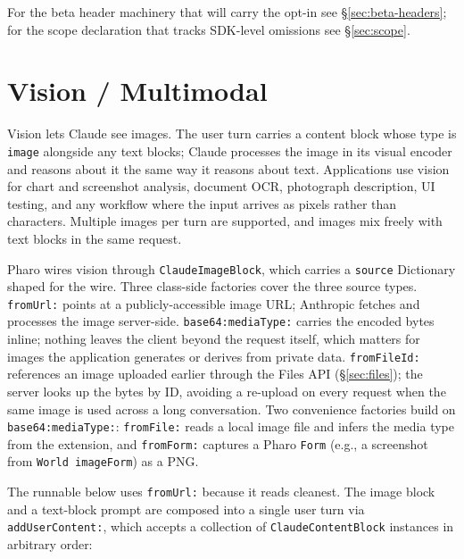 \documentclass[a4paper,10pt,fleqn]{article}
\begin{document}
For the beta header machinery that will carry the opt-in see
\S\ref{sec:beta-headers}; for the scope declaration that tracks
SDK-level omissions see \S\ref{sec:scope}.

\medskip
\begin{sloppypar}
\end{sloppypar}

\section{Vision / Multimodal}
\label{sec:vision}

Vision lets Claude see images.  The user turn carries a content
block whose type is \texttt{image} alongside any text blocks;
Claude processes the image in its visual encoder and reasons about
it the same way it reasons about text.  Applications use vision for
chart and screenshot analysis, document OCR, photograph
description, UI testing, and any workflow where the input arrives
as pixels rather than characters.  Multiple images per turn are
supported, and images mix freely with text blocks in the same
request.

Pharo wires vision through \texttt{ClaudeImageBlock}, which carries
a \texttt{source} Dictionary shaped for the wire.  Three class-side
factories cover the three source types.  \texttt{fromUrl:} points
at a publicly-accessible image URL; Anthropic fetches and processes
the image server-side.  \texttt{base64:mediaType:} carries the
encoded bytes inline; nothing leaves the client beyond the request
itself, which matters for images the application generates or
derives from private data.  \texttt{fromFileId:} references an
image uploaded earlier through the Files API
(\S\ref{sec:files}); the server looks up the bytes by ID,
avoiding a re-upload on every request when the same image is used
across a long conversation.  Two convenience factories build on
\texttt{base64:mediaType:}: \texttt{fromFile:} reads a local image
file and infers the media type from the extension, and
\texttt{fromForm:} captures a Pharo \texttt{Form} (e.g., a screenshot
from \texttt{World imageForm}) as a PNG.

The runnable below uses \texttt{fromUrl:} because it reads
cleanest.  The image block and a text-block prompt are composed
into a single user turn via \texttt{addUserContent:}, which accepts
a collection of \texttt{ClaudeContentBlock} instances in arbitrary
order:
\end{document}

